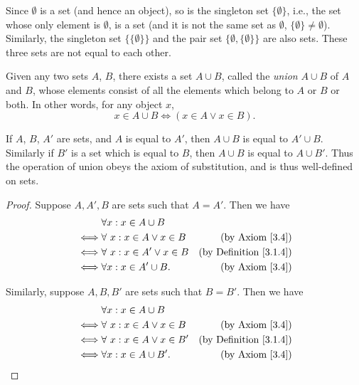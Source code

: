 \begin{example}\label{3.1.10}
Since \(\emptyset\) is a set (and hence an object), so is the singleton set \(\{\emptyset\}\), i.e., the set whose only element is \(\emptyset\), is a set (and it is not the same set as \(\emptyset\), \(\{\emptyset\} \neq \emptyset\)).
Similarly, the singleton set \(\{\{\emptyset\}\}\) and the pair set \(\{\emptyset, \{\emptyset\}\}\) are also sets.
These three sets are not equal to each other.
\end{example}

\begin{axiom}\label{3.4}
Given any two sets \(A\), \(B\), there exists a set \(A \cup B\), called the \emph{union} \(A \cup B\) of \(A\) and \(B\), whose elements consist of all the elements which belong to \(A\) or \(B\) or both.
In other words, for any object \(x\),
\[
    x \in A \cup B \iff (x \in A \lor x \in B).
\]
\end{axiom}

\setcounter{theorem}{11}
\begin{remark}\label{3.1.12}
If \(A\), \(B\), \(A'\) are sets, and \(A\) is equal to \(A'\), then \(A \cup B\) is equal to \(A' \cup B\).
Similarly if \(B'\) is a set which is equal to \(B\), then \(A \cup B\) is equal to \(A \cup B'\).
Thus the operation of union obeys the axiom of substitution, and is thus well-defined on sets.
\end{remark}

\begin{proof}
Suppose \(A, A', B\) are sets such that \(A = A'\).
Then we have
\begin{align*}
& \forall x : x \in A \cup B \\
\iff & \forall\ x : x \in A \lor x \in B & \text{(by Axiom \ref{3.4})} \\
\iff & \forall\ x : x \in A' \lor x \in B & \text{(by Definition \ref{3.1.4})} \\
\iff & \forall x : x \in A' \cup B. & \text{(by Axiom \ref{3.4})}
\end{align*}

Similarly, suppose \(A, B, B'\) are sets such that \(B = B'\).
Then we have
\begin{align*}
& \forall x : x \in A \cup B \\
\iff & \forall\ x : x \in A \lor x \in B & \text{(by Axiom \ref{3.4})} \\
\iff & \forall\ x : x \in A \lor x \in B' & \text{(by Definition \ref{3.1.4})} \\
\iff & \forall x : x \in A \cup B'. & \text{(by Axiom \ref{3.4})}
\end{align*}
\end{proof}

